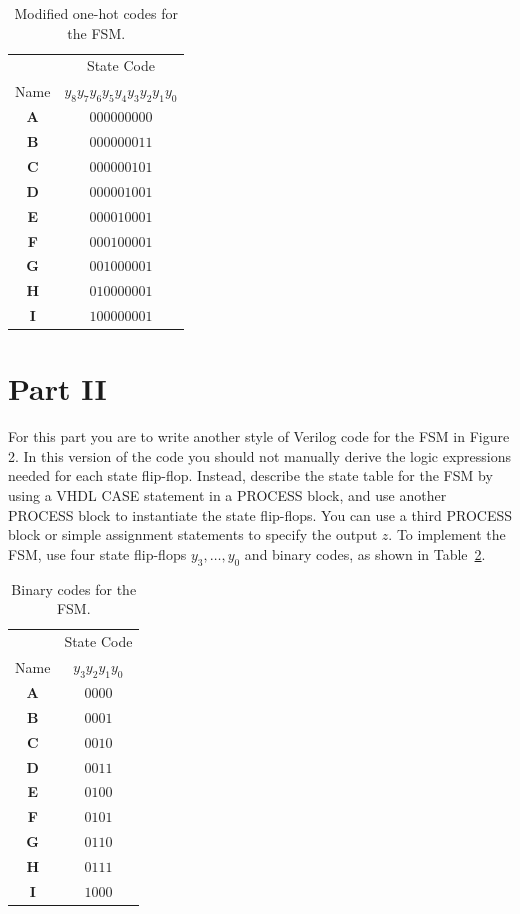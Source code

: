 \documentclass[epsfig,10pt,fullpage]{article}
\begin{document}
\begin{enumerate}
\begin{table}[H]
\begin{center}
\begin{tabular}{c|c}
~ & State Code \\ 
Name & $y_8 y_7 y_6 y_5 y_4 y_3 y_2 y_1 y_0$ \\ \hline
\rule[-0.075in]{0in}{0.25in}{\bf A} & $000000000$ \\ 
{\bf B} & $000000011$ \\ 
{\bf C} & $000000101$ \\ 
{\bf D} & $000001001$ \\ 
{\bf E} & $000010001$ \\ 
{\bf F} & $000100001$ \\ 
{\bf G} & $001000001$ \\ 
{\bf H} & $010000001$ \\ 
{\bf I} & $100000001$ \\
\end{tabular}
\end{center}
\caption{Modified one-hot codes for the FSM.}
\label{tab:modified_state_assignment}
\end{table}

\end{enumerate}

\section*{Part II}
For this part you are to write another style of Verilog code for the FSM in Figure 2. In
this version of the code you should not manually derive the logic expressions needed for
each state flip-flop. Instead, describe the state table for the FSM by using a
VHDL CASE statement in a PROCESS block, and use another PROCESS block to
instantiate the state flip-flops. You can use a third PROCESS block or simple assignment
statements to specify the output $z$. To implement the FSM, use four state flip-flops
$y_3, \ldots, y_0$ and binary codes, as shown in Table~\ref{tab:bincodes}.

\begin{table}[H]
\begin{center}
\begin{tabular}{c|c}
~ & State Code \\ 
Name & $y_3 y_2 y_1 y_0$ \\ \hline
\rule[-0.075in]{0in}{0.25in}{\bf A} & $0000$ \\ 
{\bf B} & $0001$ \\ 
{\bf C} & $0010$ \\ 
{\bf D} & $0011$ \\ 
{\bf E} & $0100$ \\ 
{\bf F} & $0101$ \\ 
{\bf G} & $0110$ \\ 
{\bf H} & $0111$ \\ 
{\bf I} & $1000$ \\ 
\end{tabular}
\end{center}
\caption{Binary codes for the FSM.}
\label{tab:bincodes}
\end{table}
\end{document}
